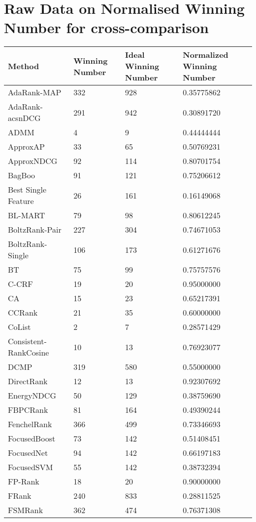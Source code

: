 \chapter{Raw Data on Normalised Winning Number for cross-comparison}
\label{app:norm_winnum_all}

\begin{longtable}{l|l|l|l}
Method & Winning Number & Ideal Winning Number & Normalized Winning Number \\
\hline
AdaRank-\acs{MAP} & 332 & 928 & 0.35775862 \\ 
AdaRank-acs{nDCG} & 291 & 942 & 0.30891720 \\ 
ADMM & 4 & 9 & 0.44444444 \\ 
ApproxAP & 33 & 65 & 0.50769231 \\ 
ApproxNDCG & 92 & 114 & 0.80701754 \\ 
BagBoo & 91 & 121 & 0.75206612 \\ 
Best Single Feature & 26 & 161 & 0.16149068 \\ 
BL-MART & 79 & 98 & 0.80612245 \\ 
BoltzRank-Pair & 227 & 304 & 0.74671053 \\ 
BoltzRank-Single & 106 & 173 & 0.61271676 \\ 
BT & 75 & 99 & 0.75757576 \\ 
C-CRF & 19 & 20 & 0.95000000 \\ 
CA & 15 & 23 & 0.65217391 \\ 
CCRank & 21 & 35 & 0.60000000 \\ 
CoList & 2 & 7 & 0.28571429 \\ 
Consistent-RankCosine & 10 & 13 & 0.76923077 \\ 
DCMP & 319 & 580 & 0.55000000 \\ 
DirectRank & 12 & 13 & 0.92307692 \\ 
EnergyNDCG & 50 & 129 & 0.38759690 \\ 
FBPCRank & 81 & 164 & 0.49390244 \\ 
FenchelRank & 366 & 499 & 0.73346693 \\ 
FocusedBoost & 73 & 142 & 0.51408451 \\ 
FocusedNet & 94 & 142 & 0.66197183 \\ 
FocusedSVM & 55 & 142 & 0.38732394 \\ 
FP-Rank & 18 & 20 & 0.90000000 \\ 
FRank & 240 & 833 & 0.28811525 \\ 
FSMRank & 362 & 474 & 0.76371308 \\ 

\end{longtable}
